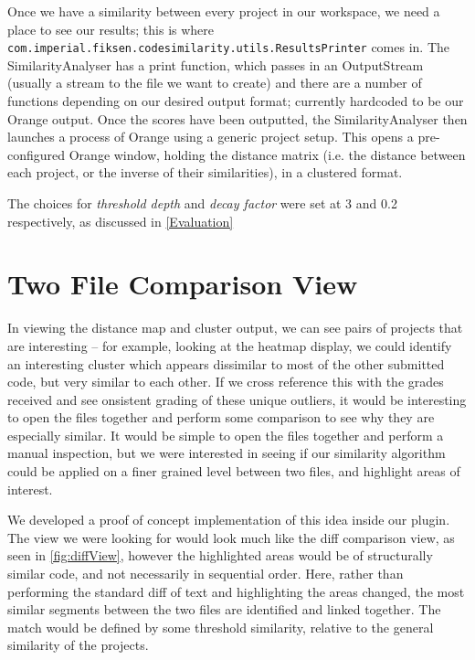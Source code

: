 Once we have a similarity between every project in our workspace, we need a place
to see our results; this is where 
\texttt{com.imperial.fiksen.codesimilarity.utils.ResultsPrinter} comes in.
The SimilarityAnalyser has a print function, which
passes in an OutputStream (usually a stream to the file we want to create) and
there are a number of functions depending on our desired output format; currently
hardcoded to be our Orange output. Once the scores have been outputted, the SimilarityAnalyser
then launches a process of Orange using a generic project setup. This opens a pre-
configured Orange window, holding the distance matrix (i.e. the distance between
each project, or the inverse of their similarities), in a clustered format.

The choices for \emph{threshold depth} and \emph{decay factor} were set at 3 and 0.2
respectively, as discussed in \cref{Evaluation}

\section{Two File Comparison View}
\label{sec:Two File Comparison View}

In viewing the distance map and cluster output, we can see pairs of projects that are
interesting -- for example, looking at the heatmap display,
we could identify an interesting cluster which
appears dissimilar to most of the other submitted code, but very similar to
each other. If we cross reference this with the grades received and see
onsistent grading of these unique outliers, it would be interesting to open
the files together and perform some comparison to see why they are especially
similar. It would be simple to open the files together and perform a manual
inspection, but we were interested in seeing if our similarity algorithm could
be applied on a finer grained level between two files, and highlight areas
of interest.

We developed a proof of concept implementation of this idea inside our plugin.
The view we were looking for would look much like the diff comparison view,
as seen in \cref{fig:diffView}, however the highlighted areas would
be of structurally similar code, and not necessarily in sequential order. Here,
rather than performing the standard diff of text and highlighting the areas
changed, the most similar segments between the two files are identified and
linked together. The match would be defined by some threshold similarity, relative
to the general similarity of the projects.

